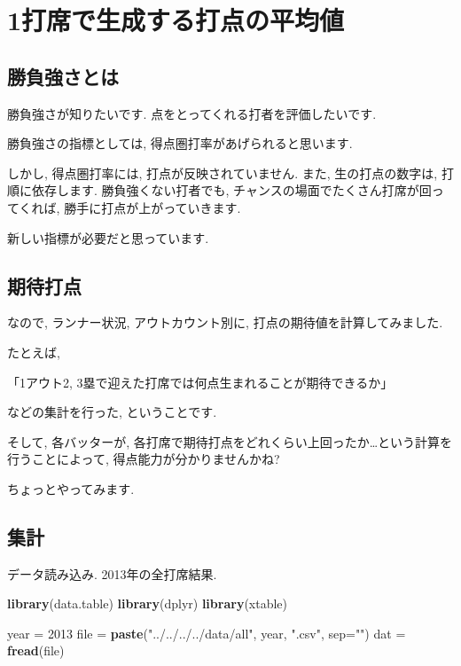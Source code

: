 \documentclass[]{article}
\author{}
\date{}
\newenvironment{Shaded}{}{}
\newcommand{\KeywordTok}[1]{\textcolor[rgb]{0.00,0.44,0.13}{\textbf{{#1}}}}
\newcommand{\DataTypeTok}[1]{\textcolor[rgb]{0.56,0.13,0.00}{{#1}}}
\newcommand{\DecValTok}[1]{\textcolor[rgb]{0.25,0.63,0.44}{{#1}}}
\newcommand{\StringTok}[1]{\textcolor[rgb]{0.25,0.44,0.63}{{#1}}}
\newcommand{\NormalTok}[1]{{#1}}
\begin{document}
\section{1打席で生成する打点の平均値}\label{ux6253ux5e2dux3067ux751fux6210ux3059ux308bux6253ux70b9ux306eux5e73ux5747ux5024}

\subsection{勝負強さとは}\label{ux52ddux8ca0ux5f37ux3055ux3068ux306f}

勝負強さが知りたいです. 点をとってくれる打者を評価したいです.

勝負強さの指標としては, 得点圏打率があげられると思います.

しかし, 得点圏打率には, 打点が反映されていません. また,
生の打点の数字は, 打順に依存します. 勝負強くない打者でも,
チャンスの場面でたくさん打席が回ってくれば,
勝手に打点が上がっていきます.

新しい指標が必要だと思っています.

\subsection{期待打点}\label{ux671fux5f85ux6253ux70b9}

なので, ランナー状況, アウトカウント別に,
打点の期待値を計算してみました.

たとえば,

「1アウト2, 3塁で迎えた打席では何点生まれることが期待できるか」

などの集計を行った, ということです.

そして, 各バッターが,
各打席で期待打点をどれくらい上回ったか\ldots{}という計算を行うことによって,
得点能力が分かりませんかね?

ちょっとやってみます.

\subsection{集計}\label{ux96c6ux8a08}

データ読み込み. 2013年の全打席結果.

\begin{Shaded}
\begin{Highlighting}[]
\KeywordTok{library}\NormalTok{(data.table)}
\KeywordTok{library}\NormalTok{(dplyr)}
\KeywordTok{library}\NormalTok{(xtable)}

\NormalTok{year =}\StringTok{ }\DecValTok{2013}
\NormalTok{file =}\StringTok{ }\KeywordTok{paste}\NormalTok{(}\StringTok{"../../../../data/all"}\NormalTok{, year, }\StringTok{".csv"}\NormalTok{, }\DataTypeTok{sep=}\StringTok{""}\NormalTok{)}
\NormalTok{dat =}\StringTok{ }\KeywordTok{fread}\NormalTok{(file)}
\end{Highlighting}
\end{Shaded}
\end{document}
